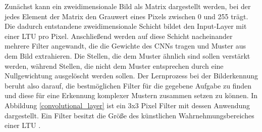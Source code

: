 Zunächst kann ein zweidimensionale Bild als Matrix dargestellt werden, bei der jedes Element der Matrix den Grauwert eines Pixels zwischen 0 und 255 trägt. Die dadurch entstandene zweidimensionale Schicht bildet den Input-Layer mit einer LTU pro Pixel. Anschließend werden auf diese Schicht nacheinander mehrere Filter angewandt, die die Gewichte des CNNs tragen und Muster aus dem Bild extrahieren. Die Stellen, die dem Muster ähnlich sind sollen verstärkt werden, während Stellen, die nicht dem Muster entsprechen durch eine Nullgewichtung ausgelöscht werden sollen. Der Lernprozess bei der Bilderkennung beruht also darauf, die bestmöglichen Filter für die gegebene Aufgabe zu finden und diese für eine Erkennung komplexer Mustern zusammen setzen zu können. In Abbildung \ref{convolutional_layer} ist ein 3x3 Pixel Filter mit dessen Anwendung dargestellt. Ein Filter besitzt die Größe des künstlichen Wahrnehmungsbereiches einer LTU \cite{AurelienGeron.2018}.

